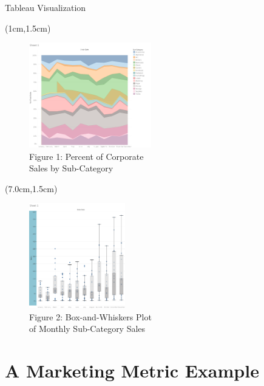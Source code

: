 \documentclass[pdf]{beamer}
\theoremstyle{remark}
\theoremstyle{definition}
\begin{document}
\begin{frame}[t]{Tableau Visualization}

\begin{textblock*}{5cm}(1cm,1.5cm)
\begin{figure}[htbp]
  \captionsetup{justification=centering}
  \includegraphics[height=1.8in]{Images/PT_C27_082322.png}
  \caption{Figure {\color{franklinblue} 1}: Percent of Corporate \\ Sales by Sub-Category}
\end{figure}
\end{textblock*}

\begin{textblock*}{5cm}(7.0cm,1.5cm)
\begin{figure}[htbp]
  \captionsetup{justification=centering}
  \includegraphics[height=1.8in]{Images/PT_C29_082522.png}
  \caption{Figure {\color{franklinblue} 2}: Box-and-Whiskers Plot \\ of Monthly Sub-Category Sales }
\end{figure}
\end{textblock*}

\end{frame}

\section{A Marketing Metric Example}
\end{document}

